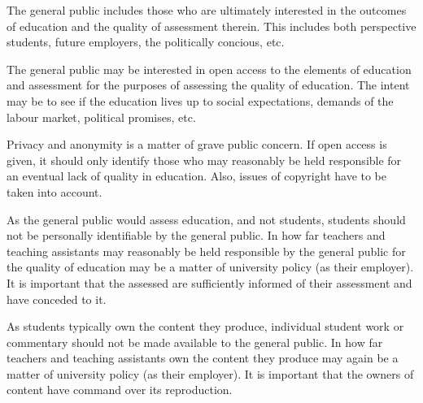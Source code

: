 The general public includes those who are ultimately interested in the outcomes
of education and the quality of assessment therein. This includes both
perspective students, future employers, the politically concious, etc.

The general public may be interested in open access to the elements of
education and assessment for the purposes of assessing the quality of
education. The intent may be to see if the education lives up to social
expectations, demands of the labour market, political promises, etc.

Privacy and anonymity is a matter of grave public concern. If open access is
given, it should only identify those who may reasonably be held responsible for
an eventual lack of quality in education. Also, issues of copyright have to be
taken into account.

As the general public would assess education, and not students, students should
not be personally identifiable by the general public. In how far teachers and
teaching assistants may reasonably be held responsible by the general public
for the quality of education may be a matter of university policy (as their
employer). It is important that the assessed are sufficiently informed of their
assessment and have conceded to it.

As students typically own the content they produce, individual student work or
commentary should not be made available to the general public. In how far
teachers and teaching assistants own the content they produce may again be a
matter of university policy (as their employer). It is important that the
owners of content have command over its reproduction.
